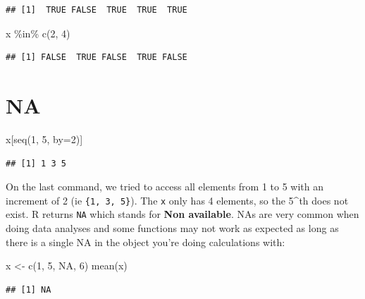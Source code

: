 \documentclass[
]{book}
\newenvironment{Shaded}{\begin{snugshade}}{\end{snugshade}}
\newcommand{\AttributeTok}[1]{\textcolor[rgb]{0.77,0.63,0.00}{#1}}
\newcommand{\ConstantTok}[1]{\textcolor[rgb]{0.00,0.00,0.00}{#1}}
\newcommand{\DecValTok}[1]{\textcolor[rgb]{0.00,0.00,0.81}{#1}}
\newcommand{\FunctionTok}[1]{\textcolor[rgb]{0.00,0.00,0.00}{#1}}
\newcommand{\NormalTok}[1]{#1}
\newcommand{\OtherTok}[1]{\textcolor[rgb]{0.56,0.35,0.01}{#1}}
\newcommand{\SpecialCharTok}[1]{\textcolor[rgb]{0.00,0.00,0.00}{#1}}
\begin{document}
\begin{verbatim}
## [1]  TRUE FALSE  TRUE  TRUE  TRUE
\end{verbatim}

\begin{Shaded}
\begin{Highlighting}[]
\NormalTok{x }\SpecialCharTok{\%in\%} \FunctionTok{c}\NormalTok{(}\DecValTok{2}\NormalTok{, }\DecValTok{4}\NormalTok{)}
\end{Highlighting}
\end{Shaded}

\begin{verbatim}
## [1] FALSE  TRUE FALSE  TRUE FALSE
\end{verbatim}

\hypertarget{na}{%
\section{NA}\label{na}}

\begin{Shaded}
\begin{Highlighting}[]
\NormalTok{x[}\FunctionTok{seq}\NormalTok{(}\DecValTok{1}\NormalTok{, }\DecValTok{5}\NormalTok{, }\AttributeTok{by=}\DecValTok{2}\NormalTok{)]}
\end{Highlighting}
\end{Shaded}

\begin{verbatim}
## [1] 1 3 5
\end{verbatim}

On the last command, we tried to access all elements from 1 to 5 with an increment of 2 (ie \texttt{\{1,\ 3,\ 5\}}). The \texttt{x} only has 4 elements, so the 5\^{}th does not exist. R returns \texttt{NA} which stands for \textbf{Non available}. NAs are very common when doing data analyses and some functions may not work as expected as long as there is a single NA in the object you're doing calculations with:

\begin{Shaded}
\begin{Highlighting}[]
\NormalTok{x }\OtherTok{\textless{}{-}} \FunctionTok{c}\NormalTok{(}\DecValTok{1}\NormalTok{, }\DecValTok{5}\NormalTok{, }\ConstantTok{NA}\NormalTok{, }\DecValTok{6}\NormalTok{)}
\FunctionTok{mean}\NormalTok{(x)}
\end{Highlighting}
\end{Shaded}

\begin{verbatim}
## [1] NA
\end{verbatim}
\end{document}
